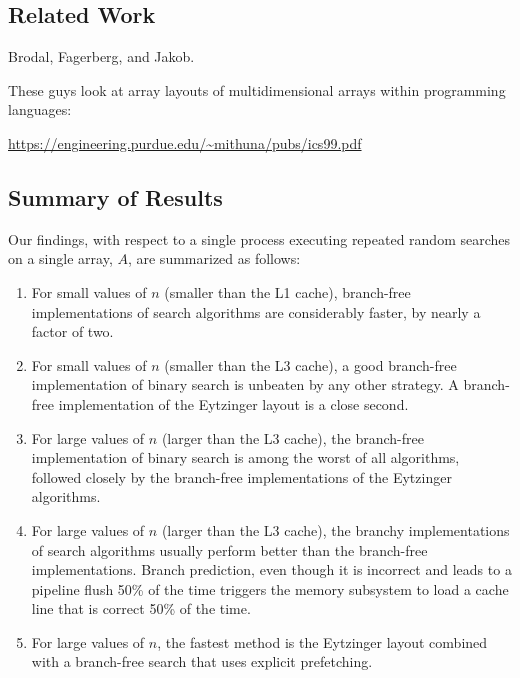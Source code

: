 \documentclass{patmorin}
\begin{document}
\subsection{Related Work}

Brodal, Fagerberg, and Jakob.


These guys look at array layouts of multidimensional arrays within programming languages:

\url{https://engineering.purdue.edu/~mithuna/pubs/ics99.pdf}


\subsection{Summary of Results}

Our findings, with respect to a single process executing repeated random
searches on a single array, $A$, are summarized as follows:

\begin{enumerate}
  \item For small values of $n$ (smaller than the L1 cache), branch-free
    implementations of search algorithms are considerably faster, by nearly
    a factor of two.
  
  \item For small values of $n$ (smaller than the L3 cache), a good
    branch-free implementation of binary search is unbeaten by any other
    strategy.  A branch-free implementation of the Eytzinger layout is a
    close second.
  
  \item For large values of $n$ (larger than the L3 cache), the branch-free
    implementation of binary search is among the worst of all algorithms,
    followed closely by the branch-free implementations of the Eytzinger
    algorithms.
  
  \item For large values of $n$ (larger than the L3 cache), the branchy
    implementations of search algorithms usually perform better than the
    branch-free implementations.  Branch prediction, even though it is
    incorrect and leads to a pipeline flush 50\% of the time triggers
    the memory subsystem to load a cache line that is correct 50\%
    of the time.  

  \item For large values of $n$, the fastest method is the Eytzinger layout
   combined with a branch-free search that uses explicit prefetching.
\end{enumerate}
\end{document}
